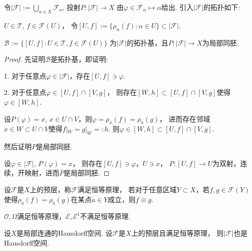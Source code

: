 \begin{definition}
	令$|\mathscr{F}|:=\bigcup\limits_{a\in X} \mathscr{F}_a$, 
    投射$P\colon |\mathscr{F}|\rightarrow X$
    由$\varphi\in \mathscr{F}_\alpha \mapsto \alpha$给出. 
    引入$|\mathscr{F}|$的拓扑如下:

	$U\in \mathscr{T}$, $f\in \mathscr{F}(U)$，
    令$[U,f]:=\{\rho_\alpha(f):\alpha \in U\}\subset |\mathscr{F}|$.
\end{definition}
		
\begin{theorem}
	$\mathscr{B}:=\{[U,f]:U\in \mathscr{T}, f\in \mathscr{F}(U)\}$
    为$|\mathscr{F}|$的拓扑基，且$P\colon |\mathscr{F}|\rightarrow X$为局部同胚.
\end{theorem}
		
\begin{proof}
	先证明$\mathscr{B}$是拓扑基，即证明:\par
	1. 对于任意点$\varphi\in |\mathscr{F}|$，存在$[U,f]\ni \varphi$.\par
	2. 对于任意点$\varphi\in [U,f]\cap [V,g]$，
    则存在$[W,h] \subset [U,f]\cap [V,g]$使得$\varphi\in [W,h]$.

	设$P(\varphi)=x$, $x\in U\cap V$，则$\varphi=\rho_x(f)=\rho_x(g)$，
    进而存在邻域$x\in W\subset U\cap V$使得$f|_W=g|_W=:h$. 
    则$\varphi\in [W,h]\subset [U,f]\cap [V,g]$.

	然后证明$P$是局部同胚.

	设$\varphi\in |\mathscr{F}|$, $P(\varphi)=x$，
    则存在$[U,f]\ni \varphi$，$U\ni x$，
    $P\colon [U,f]\rightarrow U$为双射，连续，开映射，进而$P$是局部同胚.
\end{proof}
		
\begin{definition}
	设$\mathscr{F}$是$X$上的预层，称$\mathscr{F}$满足恒等原理，
    若对于任意区域$Y\subset X$，若$f, g \in \mathscr{F}(Y)$
    使得$\rho_a(f)=\rho_a(g)$在某点$a\in Y$成立，则$f\equiv g$.
\end{definition}
		
\begin{example}
	$\mathcal{O},\Omega$满足恒等原理，$\mathcal{E}, \mathcal{E}^1$不满足恒等原理.
\end{example}
		
\begin{theorem}
	设$X$是局部连通的Hausdorff空间. 设$\mathscr{F}$是$X$上的预层且满足恒等原理，
    则$|\mathscr{F}|$也是Hausdorff空间.
\end{theorem}
		

